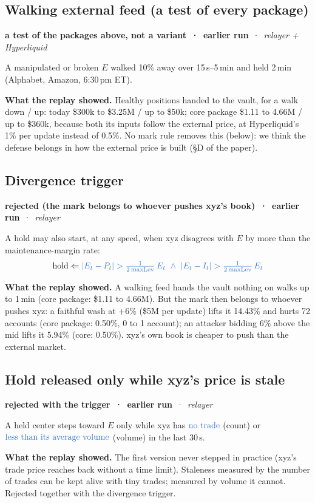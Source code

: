 \documentclass[10.5pt,a4paper]{article}
\newcommand{\chg}[1]{\ensuremath{{\color[HTML]{2F74D0}#1}}}
\newcommand{\st}[3]{\textcolor{#1}{\textbf{#2}} \,·\, \emph{#3}\par}
\newcommand{\res}[1]{\par\textbf{What the replay showed.} #1\par}
\begin{document}
\subsection{Walking external feed (a test of every package)}\label{var:auto22}
\st{sup}{a test of the packages above, not a variant \,·\, earlier run}{relayer + Hyperliquid}
A manipulated or broken $E$ walked 10\% away over 15\,s--5\,min and held 2\,min (Alphabet, Amazon, 6:30\,pm ET). 
\res{Healthy positions handed to the vault, for a walk down / up: today \$300k to \$3.25M / up to \$50k; core package \$1.11 to 4.66M / up to \$360k, because both its inputs follow the external price, at Hyperliquid's 1\% per update instead of 0.5\%. No mark rule removes this (below): we think the defense belongs in how the external price is built (\S D of the paper).}

\subsection{Divergence trigger}\label{var:auto23}
\st{rej}{rejected (the mark belongs to whoever pushes xyz's book) \,·\, earlier run}{relayer}
A hold may also start, at any speed, when xyz disagrees with $E$ by more than the maintenance-margin rate:
\begin{equation}
\text{hold} \Leftarrow \chg{|E_t-P_t| > \tfrac{1}{2\,\text{maxLev}}\,E_t\ \wedge\ |E_t-I_t| > \tfrac{1}{2\,\text{maxLev}}\,E_t}
\end{equation}
\res{A walking feed hands the vault nothing on walks up to 1\,min (core package: \$1.11 to 4.66M). But the mark then belongs to whoever pushes xyz: a faithful wash at $+6\%$ (\$5M per update) lifts it 14.43\% and hurts 72 accounts (core package: 0.50\%, 0 to 1 account); an attacker bidding 6\% above the mid lifts it 5.94\% (core: 0.50\%). xyz's own book is cheaper to push than the external market.}

\subsection{Hold released only while xyz's price is stale}\label{var:auto24}
\st{rej}{rejected with the trigger \,·\, earlier run}{relayer}
A held center steps toward $E$ only while xyz has \chg{\text{no trade}} (count) or \chg{\text{less than its average volume}} (volume) in the last 30\,s.
\res{The first version never stepped in practice (xyz's trade price reaches back without a time limit). Staleness measured by the number of trades can be kept alive with tiny trades; measured by volume it cannot. Rejected together with the divergence trigger.}
\end{document}
